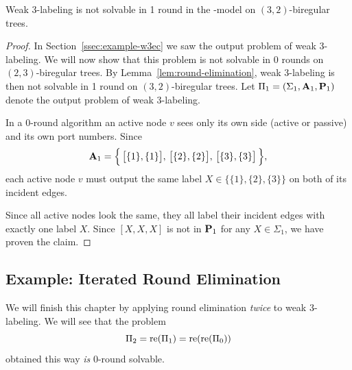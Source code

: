 \begin{lemma}
	Weak 3-labeling is not solvable in 1 round in the \PN-model on $(3,2)$-biregular trees.
\end{lemma}

\begin{proof}
	In Section~\ref{ssec:example-w3ec} we saw the output problem of weak 3-labeling. We will now show that this problem is not solvable in 0 rounds on $(2,3)$-biregular trees. By Lemma~\ref{lem:round-elimination}, weak 3-labeling is then not solvable in 1 round on $(3,2)$-biregular trees. Let $\Pi_1 = (\Sigma_1, \mathbf{A}_1, \mathbf{P}_1)$ denote the output problem of weak 3-labeling.
	
	In a 0-round algorithm an active node $v$ sees only its own side (active or passive) and its own port numbers. Since
	\[ 
	\mathbf{A}_1 = \Bigl\{\, \bigl[\{ 1 \}, \{1 \}\bigr],\, \bigl[\{ 2 \}, \{2 \}\bigr],\, \bigl[\{ 3 \}, \{3 \}\bigr] \,\Bigr\},
	\] 
	each active node $v$ must output the same label $X \in \bigl\{ \{1\}, \{2\}, \{3\} \bigr\}$ on both of its incident edges.
	
	Since all active nodes look the same, they all label their incident edges with exactly one label $X$. Since $[X, X, X]$ is not in $\mathbf{P}_1$ for any $X \in \Sigma_1$, we have proven the claim. 
\end{proof}

\subsection{Example: Iterated Round Elimination} \label{ssec:repeated}

We will finish this chapter by applying round elimination \emph{twice} to weak 3-labeling. We will see that the problem
\[
	\Pi_2 = \operatorname{re}(\Pi_1) = \operatorname{re}(\operatorname{re}(\Pi_0))
\]
obtained this way \emph{is} $0$-round solvable.

